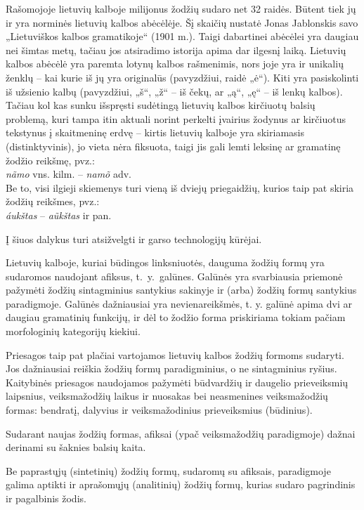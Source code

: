 \documentclass[]{../metanetpaper}
\begin{document}
\begin{multicols}{2}
Rašomojoje lietuvių kalboje milijonus žodžių sudaro net 32 raidės. Būtent tiek jų ir yra norminės lietuvių kalbos abėcėlėje. Šį skaičių nustatė Jonas Jablonskis savo „Lietuviškos kalbos gramatikoje“ (1901 m.). Taigi dabartinei abėcėlei yra daugiau nei šimtas metų, tačiau jos atsiradimo istorija apima dar ilgesnį laiką. Lietuvių kalbos abėcėlė yra paremta lotynų kalbos rašmenimis, nors joje yra ir unikalių ženklų – kai kurie iš jų yra originalūs (pavyzdžiui, raidė „ė“). Kiti yra pasiskolinti iš užsienio kalbų (pavyzdžiui, „š“, „ž“ – iš čekų,  ar „ą“, „ę“ – iš lenkų kalbos). Tačiau kol kas sunku išspręsti sudėtingą lietuvių kalbos kirčiuotų balsių problemą, kuri tampa itin aktuali norint perkelti įvairius žodynus ar kirčiuotus tekstynus į skaitmeninę erdvę – kirtis lietuvių kalboje yra skiriamasis (distinktyvinis), jo vieta nėra fiksuota, taigi jis gali lemti leksinę ar gramatinę žodžio reikšmę, pvz.:\\
    \textit{nãmo} vns. kilm. – \textit{namõ} adv. \\
    Be to, visi ilgieji skiemenys turi vieną iš dviejų priegaidžių, kurios taip pat skiria žodžių reikšmes, pvz.:\\
    \textit{áukštas} – \textit{aũkštas}  ir pan.

    Į šiuos dalykus turi atsižvelgti ir garso technologijų kūrėjai.
    
    Lietuvių kalboje, kuriai būdingos linksniuotės, dauguma žodžių formų yra sudaromos naudojant afiksus, t.~y.~galūnes. Galūnės yra svarbiausia priemonė pažymėti žodžių sintagminius santykius sakinyje ir (arba) žodžių formų santykius paradigmoje.   Galūnės dažniausiai yra nevienareikšmės, t. y. galūnė apima dvi ar daugiau gramatinių funkcijų, ir dėl to žodžio forma priskiriama tokiam pačiam morfologinių kategorijų kiekiui.
   
Priesagos taip pat plačiai vartojamos lietuvių kalbos žodžių formoms sudaryti. Jos dažniausiai reiškia žodžių formų paradigminius, o ne sintagminius ryšius. Kaitybinės priesagos naudojamos pažymėti būdvardžių ir daugelio prieveiksmių laipsnius, veiksmažodžių laikus ir nuosakas bei neasmenines veiksmažodžių formas: bendratį, dalyvius ir veiksmažodinius prieveiksmius (būdinius).

Sudarant naujas žodžių formas, afiksai (ypač veiksmažodžių paradigmoje) dažnai derinami su šaknies balsių kaita.

Be paprastųjų (sintetinių) žodžių formų, sudaromų su afiksais, paradigmoje galima aptikti ir aprašomųjų (analitinių) žodžių formų, kurias sudaro pagrindinis ir pagalbinis žodis.


\end{multicols}
\end{document}
